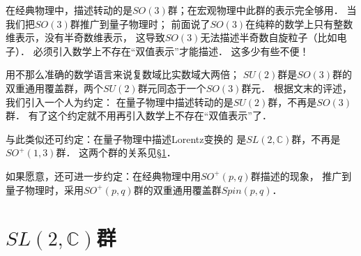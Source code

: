 在经典物理中，描述转动的是$SO(3)$群；在宏观物理中此群的表示完全够用．
当我们把$SO(3)$群推广到量子物理时；
前面说了$SO(3)$在纯粹的数学上只有整数维表示，没有半奇数维表示，
这导致$SO(3)$无法描述半奇数自旋粒子（比如电子）．
必须引入数学上不存在“双值表示”才能描述．
这多少有些不便！

用不那么准确的数学语言来说复数域比实数域大两倍；
$SU(2)$群是$SO(3)$群的双重通用覆盖群，两个$SU(2)$群元同态于一个$SO(3)$群元．
根据\textcite[\S 2.7]{weinberg_vol1}文末的评述，
我们引入一个人为约定：
{\kaishu 在量子物理中描述转动的是$SU(2)$群，不再是$SO(3)$群．}
有了这个约定就不用再引入数学上不存在“双值表示”了．

与此类似还可约定：{\kaishu 在量子物理中描述Lorentz变换的
    是$SL(2,\mathbb{C})$群，不再是$SO^{+}(1,3)$群．}
这两个群的关系见\S\ref{chlar:sec_SL2C}．

如果愿意，还可进一步约定：{\kaishu 在经典物理中用$SO^{+}(p,q)$群描述的现象，
推广到量子物理时，采用$SO^{+}(p,q)$群的双重通用覆盖群$Spin(p,q)$．}



\section{$SL(2,\mathbb{C})$群}\label{chlar:sec_SL2C}



